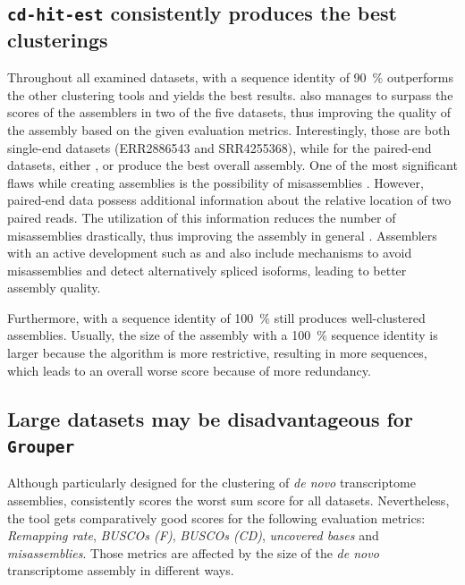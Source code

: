 \documentclass[12pt,a4paper,english]{article}
\begin{document}
	\subsection{\texttt{cd-hit-est} consistently produces the best clusterings}
		\label{ssec:cdhit_is_best}
        Throughout all examined datasets, \cdhit with a sequence identity of 90~\% outperforms the other clustering tools and yields the best results. \cdhit also manages to surpass the scores of the assemblers in two of the five datasets, thus improving the quality of the assembly based on the given evaluation metrics. Interestingly, those are both single-end datasets (ERR2886543 and SRR4255368), while for the paired-end datasets, either \spades, \soap or \trinity produce the best overall assembly.
		One of the most significant flaws while creating assemblies is the possibility of misassemblies \citep{transcriptome_misassemblies:11}. However, paired-end data possess additional information about the relative location of two paired reads.
		The utilization of this information reduces the number of misassemblies drastically, thus improving the assembly in general \citep{misassembly:15}.    
		Assemblers with an active development such as \spades \citep{rnaSPAdes:18} and \trinity \citep{Trinity:11} also include mechanisms to avoid misassemblies and detect alternatively spliced isoforms, leading to better assembly quality.
		
		Furthermore, \cdhit with a sequence identity of 100~\% still produces well-clustered assemblies. Usually, the size of the assembly with a 100~\% sequence identity is larger because the algorithm is more restrictive, resulting in more sequences, which leads to an overall worse score because of more redundancy.
	
	\subsection{Large datasets may be disadvantageous for \texttt{Grouper}}
		\label{ssec:discussion:grouper}
		Although particularly designed for the clustering of \textit{de novo} transcriptome assemblies, \grouper consistently scores the worst sum score for all datasets.
		Nevertheless, the tool gets comparatively good scores for the following evaluation metrics: \textit{Remapping rate}, \textit{BUSCOs (F)}, \textit{BUSCOs (CD)}, \textit{uncovered bases} and \textit{misassemblies}.
		Those metrics are affected by the size of the \textit{de novo} transcriptome assembly in different ways.
		
\end{document}
